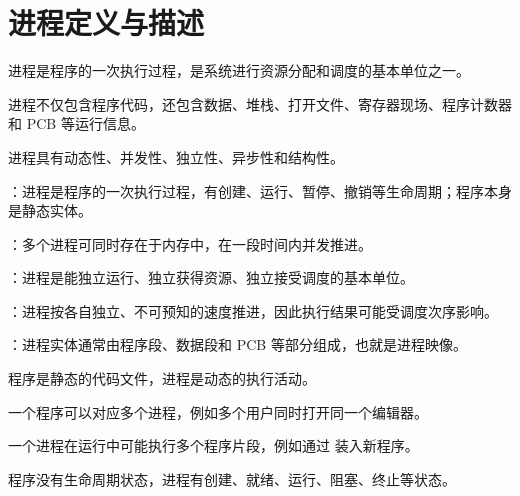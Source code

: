 \section{进程定义与描述}
\begin{points}
  \item 进程是程序的一次执行过程，是系统进行资源分配和调度的基本单位之一。
  \item 进程不仅包含程序代码，还包含数据、堆栈、打开文件、寄存器现场、程序计数器和 PCB 等运行信息。
  \item 进程具有动态性、并发性、独立性、异步性和结构性。
\end{points}


\begin{points}
  \item {}：进程是程序的一次执行过程，有创建、运行、暂停、撤销等生命周期；程序本身是静态实体。
  \item {}：多个进程可同时存在于内存中，在一段时间内并发推进。
  \item {}：进程是能独立运行、独立获得资源、独立接受调度的基本单位。
  \item {}：进程按各自独立、不可预知的速度推进，因此执行结果可能受调度次序影响。
  \item {}：进程实体通常由程序段、数据段和 PCB 等部分组成，也就是进程映像。
\end{points}


\begin{points}
  \item 程序是静态的代码文件，进程是动态的执行活动。
  \item 一个程序可以对应多个进程，例如多个用户同时打开同一个编辑器。
  \item 一个进程在运行中可能执行多个程序片段，例如通过  装入新程序。
  \item 程序没有生命周期状态，进程有创建、就绪、运行、阻塞、终止等状态。
\end{points}


